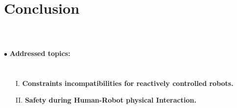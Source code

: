 \section{Conclusion}
\begin{frame}
\frametitle{{\textcolor{white}{\hspace{0.3cm}Conclusion -- contributions}}}


\hspace{-6mm}
$\bullet$ {\color{blue-violet}\textbf{Addressed topics:}}
\begin{columns}
\column{\paperwidth-10mm}
\begin{itemize}
\item[I.]  {\color{red}\textbf{Constraints incompatibilities for reactively controlled robots.}}
\item[II.] {\color{red}\textbf{Safety during Human-Robot physical Interaction.}}
\end{itemize}
\end{columns}
\end{frame}






